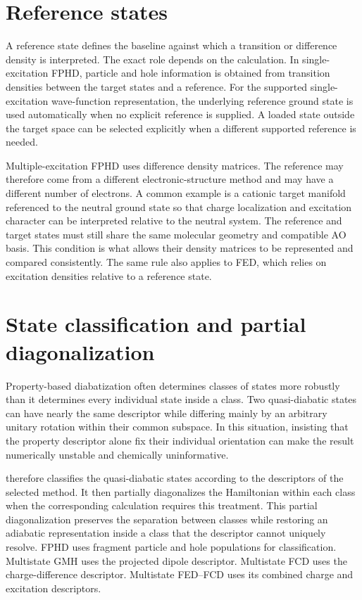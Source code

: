\section{Reference states}
A reference state defines the baseline against which a transition or difference density is interpreted. The exact role depends on the calculation. In single-excitation FPHD, particle and hole information is obtained from transition densities between the target states and a reference. For the supported single-excitation wave-function representation, the underlying reference ground state is used automatically when no explicit reference is supplied. A loaded state outside the target space can be selected explicitly when a different supported reference is needed.

Multiple-excitation FPHD uses difference density matrices. The reference may therefore come from a different electronic-structure method and may have a different number of electrons. A common example is a cationic target manifold referenced to the neutral ground state so that charge localization and excitation character can be interpreted relative to the neutral system. The reference and target states must still share the same molecular geometry and compatible AO basis. This condition is what allows their density matrices to be represented and compared consistently.
The same rule also applies to FED, which relies on excitation densities relative to a reference state.

\section{State classification and partial diagonalization}
Property-based diabatization often determines classes of states more robustly than it determines every individual state inside a class. Two  quasi-diabatic states can have nearly the same descriptor while differing mainly by an arbitrary unitary rotation within their common subspace. In this situation, insisting that the property descriptor alone fix their individual orientation can make the result numerically unstable and chemically uninformative.

\progname{} therefore classifies the quasi-diabatic states according to the descriptors of the selected method. It then partially diagonalizes the Hamiltonian within each class when the corresponding calculation requires this treatment. This partial diagonalization preserves the separation between classes while restoring an adiabatic representation inside a class that the descriptor cannot uniquely resolve. FPHD uses fragment particle and hole populations for classification. Multistate GMH uses the projected dipole descriptor. Multistate FCD uses the charge-difference descriptor. Multistate FED--FCD uses its combined charge and excitation descriptors.

